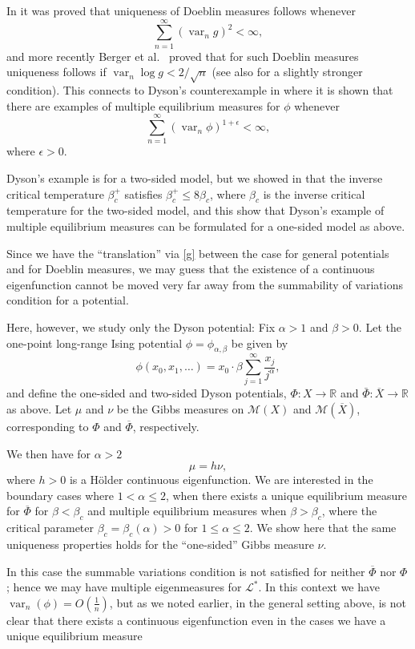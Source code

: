\documentclass[11pt, a4paper]{amsart}
\theoremstyle{definition}
\theoremstyle{remark}
\providecommand{\RR}{\mathbb{R}}
\providecommand{\CM}{\mathscr{M}}
\providecommand{\mc}{\mathcal}
\providecommand{\opn}{\operatorname}
\providecommand{\ol}{\overline}
\providecommand{\var}{\opn{var}}
\def\X{X}
\begin{document}
In \cite{johob} it was proved that uniqueness of Doeblin measures follows
whenever
$$ \sum_{n=1}^\infty (\var_n g)^2<\infty, $$
and more recently Berger et al.\ \cite{berger2} proved that for such Doeblin
measures uniqueness follows if $\var_n \log g <2/\sqrt{n}$ (see also
\cite{johob3} for a slightly stronger condition).
This connects to Dyson's counterexample in \cite{dyson} where it is shown that
there are examples of multiple equilibrium measures for $\phi$ whenever
$$\sum_{n=1}^\infty (\var_n \phi)^{1+\epsilon}<\infty,$$
where $\epsilon>0$.

Dyson's example is for a two-sided model, but we showed in \cite{johob4} that
the inverse critical temperature $\beta_c^+$ satisfies $\beta_c^+\leq 8\beta_c$, where $\beta_c$ is
the inverse critical temperature for the two-sided model, and this show that
Dyson's example of multiple equilibrium measures can be formulated for a
one-sided model as above.

Since we have the ``translation'' via \eqref{g} between the case for general
potentials and for Doeblin measures, we may guess that the existence of a
continuous eigenfunction cannot be moved very far away from the summability of
variations condition for a potential.

Here, however, we study only the Dyson potential: Fix $\alpha>1$ and $\beta>0$. Let the
one-point long-range Ising potential $\phi=\phi_{\alpha,\beta}$ be given by
$$\phi(x_0, x_1,\ldots)=x_0\cdot \beta \sum_{j=1}^\infty \frac{x_j}{j^\alpha},$$
and define the one-sided and two-sided Dyson potentials, $\Phi:\X\to \RR$ and
$\bar\Phi:\ol\X\to\RR$ as above. Let $\mu$ and $\nu$ be the Gibbs measures on $\CM(\X)$
and $\CM(\ol\X)$, corresponding to $\Phi$ and $\ol\Phi$, respectively.

We then have for $\alpha>2$
$$ \mu= h\nu, $$
where $h>0$ is a H\"older continuous eigenfunction. We are interested in the
boundary cases where $1<\alpha\le2$, when there exists a unique equilibrium measure for
$\ol\Phi$ for $\beta<\beta_c$ \cite{ACCN} and multiple equilibrium measures when $\beta>\beta_c$,
where the critical parameter $\beta_c=\beta_c(\alpha)>0$ for $1\le\alpha\le2$. We show here that the
same uniqueness properties holds for the ``one-sided'' Gibbs measure $\nu$.

In this case the summable variations condition is not satisfied for neither
$\ol\Phi$ nor $\Phi$; hence we may have multiple eigenmeasures for $\mc{L}^*$. In
this context we have $\var_n(\phi)=O(\frac{1}{n})$, but as we noted earlier, in the
general setting above, is not clear that there exists a continuous eigenfunction
even in the cases we have a unique equilibrium measure
\end{document}
